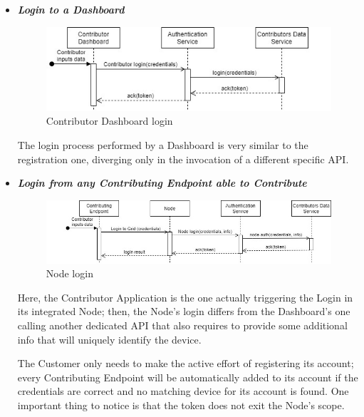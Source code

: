 \begin{itemize}
    \begin{itemize}
        \item \textbf{\textit{Login to a Dashboard}}\\
        \begin{figure}[!ht]
            \centering
            \includegraphics[scale=1]{document/chapters/chapter_6/images/use_cases_satisfaction_contributor_dashboard_login.jpg}
            \caption{Contributor Dashboard login}
            \label{fig:use_cases_satisfaction_contributor_dashboard_login}
        \end{figure}

        The login process performed by a Dashboard is very similar to the registration one, diverging only in the invocation of a different specific API.
        \vspace{4mm}

        \item \textbf{\textit{Login from any Contributing Endpoint able to Contribute}}\\
        \begin{figure}[!ht]
            \centering
            \includegraphics[scale=0.8]{document/chapters/chapter_6/images/use_cases_satisfaction_node_login.jpg}
            \caption{Node login}
            \label{fig:use_cases_satisfaction_node_login}
        \end{figure}

        Here, the Contributor Application is the one actually triggering the Login in its integrated Node; then, the Node's login differs from the Dashboard's one calling another dedicated API that also requires to provide some additional info that will uniquely identify the device.
        
        The Customer only needs to make the active effort of registering its account; every Contributing Endpoint will be automatically added to its account if the credentials are correct and no matching device for its account is found.
        One important thing to notice is that the token does not exit the Node's scope.


\end{itemize}
\end{itemize}
